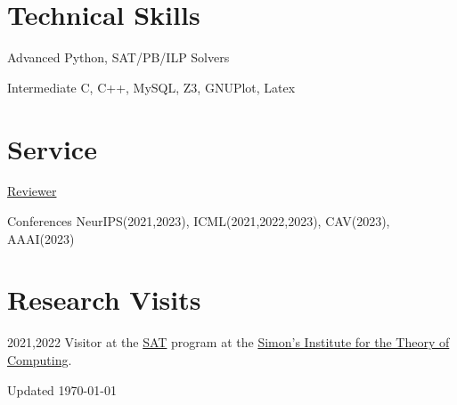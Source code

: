\documentclass[12pt,letterpaper]{report}
\begin{document}
	\section*{Technical Skills}
	\begin{tablist}
		\item[Advanced] \tab Python, SAT/PB/ILP Solvers
		\item[Intermediate] \tab C, C++, MySQL, Z3, GNUPlot, Latex
	\end{tablist}
	
	
	\section*{Service}
	\underline{Reviewer }
	\begin{tablist}
		\item[Conferences] \tab NeurIPS(2021,2023), ICML(2021,2022,2023), CAV(2023), AAAI(2023)
	\end{tablist}
	
	\section*{Research Visits}
		\begin{tablist}
	\item[2021,2022]
 Visitor at the \href{https://simons.berkeley.edu/programs/sat2021}{SAT} program at the \href{https://simons.berkeley.edu/}{Simon's Institute for the Theory of Computing}.
	\end{tablist}
	
    \begin{center}
        \vfill
        Updated \monthyeardate\today
    \end{center}
\end{document}
